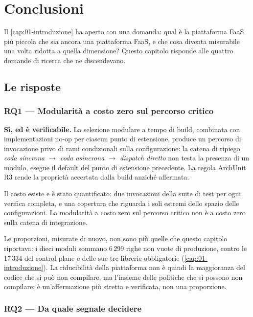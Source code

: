\chapter{Conclusioni}
\label{cap:29-conclusioni}

Il \cref{cap:01-introduzione} ha aperto con una domanda: qual \`e la piattaforma
FaaS pi\`u piccola che sia ancora una piattaforma FaaS, e che cosa diventa
misurabile una volta ridotta a quella dimensione? Questo capitolo risponde alle
quattro domande di ricerca che ne discendevano.

\section{Le risposte}

\subsection{RQ1 --- Modularit\`a a costo zero sul percorso critico}

\textbf{S\`i, ed \`e verificabile.} La selezione modulare a tempo di build,
combinata con implementazioni no-op per ciascun punto di estensione, produce un
percorso di invocazione privo di rami condizionali sulla configurazione: la
catena di ripiego \emph{coda sincrona $\to$ coda asincrona $\to$ dispatch
diretto} non testa la presenza di un modulo, esegue il default del punto di
estensione precedente. La regola ArchUnit R3 rende la propriet\`a accertata dalla
build anzich\'e affermata.

Il costo esiste e \`e stato quantificato: due invocazioni della suite di test per
ogni verifica completa, e una copertura che riguarda i soli estremi dello spazio
delle configurazioni. La modularit\`a a costo zero sul percorso critico non \`e a
costo zero sulla catena di integrazione.

Le proporzioni, misurate di nuovo, non sono pi\`u quelle che questo capitolo
riportava: i dieci moduli sommano 6\,299 righe non vuote di produzione, contro
le 17\,334 del control plane e delle sue tre librerie obbligatorie
(\cref{cap:01-introduzione}). La riducibilit\`a della piattaforma non \`e quindi
la maggioranza del codice che si pu\`o non compilare, ma l'insieme delle
politiche che si possono non compilare; \`e un'affermazione pi\`u stretta e
verificata, non una proporzione.

\subsection{RQ2 --- Da quale segnale decidere}

